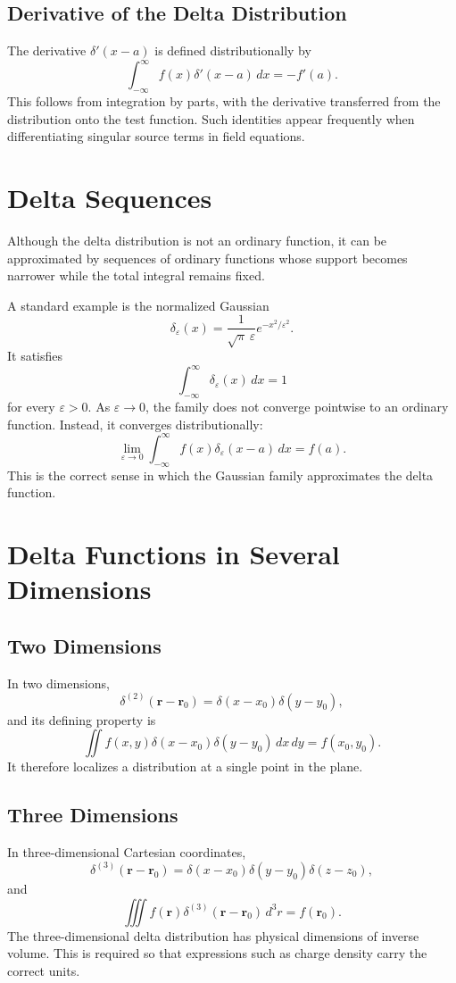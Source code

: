 \documentclass[12pt]{article}
\begin{document}
\subsection{Derivative of the Delta Distribution}
The derivative $\delta'(x-a)$ is defined distributionally by
\[
\int_{-\infty}^{\infty} f(x)\delta'(x-a)\,dx=-f'(a).
\]
This follows from integration by parts, with the derivative transferred from the distribution onto the test function. Such identities appear frequently when differentiating singular source terms in field equations.

\section{Delta Sequences}
Although the delta distribution is not an ordinary function, it can be approximated by sequences of ordinary functions whose support becomes narrower while the total integral remains fixed.

A standard example is the normalized Gaussian
\[
\delta_\varepsilon(x)=\frac{1}{\sqrt{\pi}\,\varepsilon}e^{-x^2/\varepsilon^2}.
\]
It satisfies
\[
\int_{-\infty}^{\infty}\delta_\varepsilon(x)\,dx=1
\]
for every $\varepsilon>0$. As $\varepsilon\to 0$, the family does not converge pointwise to an ordinary function. Instead, it converges distributionally:
\[
\lim_{\varepsilon\to 0}\int_{-\infty}^{\infty} f(x)\delta_\varepsilon(x-a)\,dx=f(a).
\]
This is the correct sense in which the Gaussian family approximates the delta function.

\section{Delta Functions in Several Dimensions}

\subsection{Two Dimensions}
In two dimensions,
\[
\delta^{(2)}(\mathbf r-\mathbf r_0)=\delta(x-x_0)\delta(y-y_0),
\]
and its defining property is
\[
\iint f(x,y)\delta(x-x_0)\delta(y-y_0)\,dx\,dy=f(x_0,y_0).
\]
It therefore localizes a distribution at a single point in the plane.

\subsection{Three Dimensions}
In three-dimensional Cartesian coordinates,
\[
\delta^{(3)}(\mathbf r-\mathbf r_0)=\delta(x-x_0)\delta(y-y_0)\delta(z-z_0),
\]
and
\[
\iiint f(\mathbf r)\delta^{(3)}(\mathbf r-\mathbf r_0)\,d^3r=f(\mathbf r_0).
\]
The three-dimensional delta distribution has physical dimensions of inverse volume. This is required so that expressions such as charge density carry the correct units.
\end{document}
